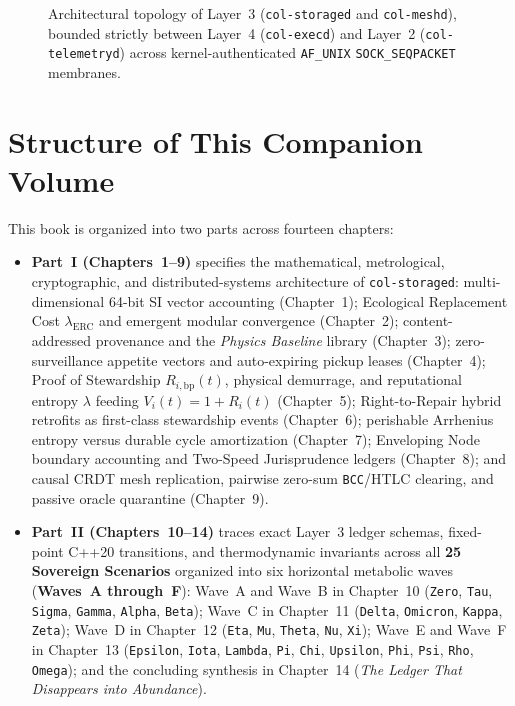 \begin{figure}[htbp]
{%
}
\caption{Architectural topology of Layer~3 (\texttt{col-storaged} and \texttt{col-meshd}), bounded strictly between Layer~4 (\texttt{col-execd}) and Layer~2 (\texttt{col-telemetryd}) across kernel-authenticated \texttt{AF\_UNIX} \texttt{SOCK\_SEQPACKET} membranes.}
\label{fig:preface-l3-architecture}
\end{figure}

\section*{Structure of This Companion Volume}

This book is organized into two parts across fourteen chapters:
\begin{itemize}
    \item \textbf{Part~I (Chapters~1--9)} specifies the mathematical, metrological, cryptographic, and distributed-systems architecture of \texttt{col-storaged}: multi-dimensional 64-bit SI vector accounting (Chapter~1); Ecological Replacement Cost $\lambda_{\mathrm{ERC}}$ and emergent modular convergence (Chapter~2); content-addressed provenance and the \textit{Physics Baseline} library (Chapter~3); zero-surveillance appetite vectors and auto-expiring pickup leases (Chapter~4); Proof of Stewardship $R_{i,\mathrm{bp}}(t)$, physical demurrage, and reputational entropy $\lambda$ feeding $V_i(t) = 1 + R_i(t)$ (Chapter~5); Right-to-Repair hybrid retrofits as first-class stewardship events (Chapter~6); perishable Arrhenius entropy versus durable cycle amortization (Chapter~7); Enveloping Node boundary accounting and Two-Speed Jurisprudence ledgers (Chapter~8); and causal CRDT mesh replication, pairwise zero-sum \texttt{BCC}/HTLC clearing, and passive oracle quarantine (Chapter~9).
    \item \textbf{Part~II (Chapters~10--14)} traces exact Layer~3 ledger schemas, fixed-point C++20 transitions, and thermodynamic invariants across all \textbf{25 Sovereign Scenarios} organized into six horizontal metabolic waves (\textbf{Waves~A through~F}): Wave~A and Wave~B in Chapter~10 (\texttt{Zero}, \texttt{Tau}, \texttt{Sigma}, \texttt{Gamma}, \texttt{Alpha}, \texttt{Beta}); Wave~C in Chapter~11 (\texttt{Delta}, \texttt{Omicron}, \texttt{Kappa}, \texttt{Zeta}); Wave~D in Chapter~12 (\texttt{Eta}, \texttt{Mu}, \texttt{Theta}, \texttt{Nu}, \texttt{Xi}); Wave~E and Wave~F in Chapter~13 (\texttt{Epsilon}, \texttt{Iota}, \texttt{Lambda}, \texttt{Pi}, \texttt{Chi}, \texttt{Upsilon}, \texttt{Phi}, \texttt{Psi}, \texttt{Rho}, \texttt{Omega}); and the concluding synthesis in Chapter~14 (\textit{The Ledger That Disappears into Abundance}).
\end{itemize}
